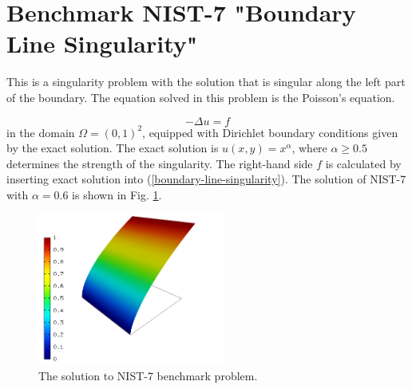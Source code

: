 \section{Benchmark NIST-7 "Boundary Line Singularity"}
\label{sec:bench-7}

This is a singularity problem with the solution that is singular along the left part of the boundary.
The equation solved in this problem is the Poisson's equation.

\begin{equation} \label{boundary-line-singularity}
-\Delta u = f
\end{equation}
in the domain $\Omega = (0, 1)^2$, equipped with Dirichlet boundary conditions
given by the exact solution. The exact solution is
$u(x,y) = x^{\alpha}$,
where $\alpha \geq 0.5$ determines the strength of the singularity.
The right-hand side $f$ is calculated by inserting exact solution into (\ref{boundary-line-singularity}).
The solution of NIST-7 with $\alpha = 0.6$ is shown in Fig. \ref{fig:sln-nist07}.

\begin{figure}[!ht]
\centering
\includegraphics[height=5cm]{nist/nist-7/solution.png}
\caption{The solution to NIST-7 benchmark problem.}
\label{fig:sln-nist07}
\end{figure}

